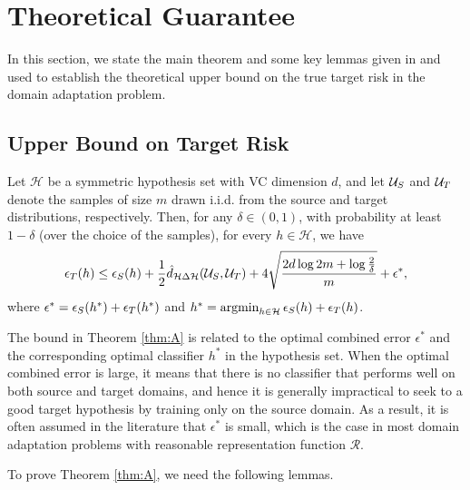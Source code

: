 \section{Theoretical Guarantee}
In this section, we state the main theorem and some key lemmas given in \cite{BenDavid2006} and \cite{BenDavid2010} used to establish the theoretical upper bound on the true target risk in the domain adaptation problem.

\subsection{Upper Bound on Target Risk}
\begin{theorem}\label{thm:A}
  Let $\mathcal{H}$ be a symmetric hypothesis set with VC dimension $d$, and let $\mathcal{U}_S$ and $\mathcal{U}_T$ denote the samples of size $m$ drawn i.i.d. from the source and target distributions, respectively. Then, for any $\delta \in (0,1)$, with probability at least $1-\delta$ (over the choice of the samples), for every $h \in \mathcal{H}$, we have
  \begin{equation}\label{eq:A}
    \epsilon_{T}(h) \leq \epsilon_{S}(h) + \frac{1}{2} \hat{d}_{\mathcal{H} \Delta \mathcal{H}}(\mathcal{U}_S, \mathcal{U}_T) + 4 \sqrt{\frac{2d \log{2m} + \log{\frac{2}{\delta}}}{m}} + \epsilon^{*},
  \end{equation}
  where $\epsilon^{*} = \epsilon_{S}(h^*) + \epsilon_{T}(h^*)$ and $h^* = \mathop{\mathrm{argmin}}_{h \in \mathcal{H}} \epsilon_{S}(h) + \epsilon_{T}(h)$.
\end{theorem}

The bound in Theorem \ref{thm:A} is related to the optimal combined error $\epsilon^{*}$ and the corresponding optimal classifier $h^*$ in the hypothesis set. When the optimal combined error is large, it means that there is no classifier that performs well on both source and target domains, and hence it is generally impractical to seek to a good target hypothesis by training only on the source domain. As a result, it is often assumed in the literature that $\epsilon^{*}$ is small, which is the case in most domain adaptation problems with reasonable representation function $\mathcal{R}$.

To prove Theorem \ref{thm:A}, we need the following lemmas.

